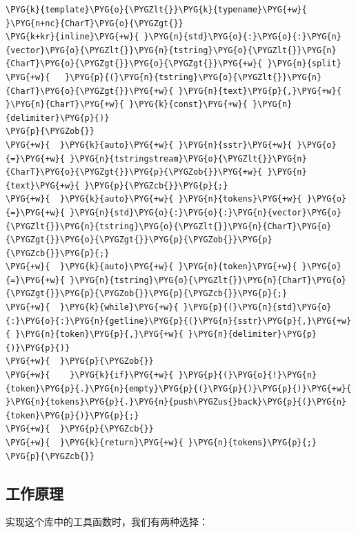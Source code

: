 \begin{codeblockbg}
\begin{Verbatim}[commandchars=\\\{\},breaklines=true,breakanywhere=true,fontsize=\codefont,xleftmargin=17bp]
\PYG{k}{template}\PYG{o}{\PYGZlt{}}\PYG{k}{typename}\PYG{+w}{ }\PYG{n+nc}{CharT}\PYG{o}{\PYGZgt{}}
\PYG{k+kr}{inline}\PYG{+w}{ }\PYG{n}{std}\PYG{o}{:}\PYG{o}{:}\PYG{n}{vector}\PYG{o}{\PYGZlt{}}\PYG{n}{tstring}\PYG{o}{\PYGZlt{}}\PYG{n}{CharT}\PYG{o}{\PYGZgt{}}\PYG{o}{\PYGZgt{}}\PYG{+w}{ }\PYG{n}{split}
\PYG{+w}{   }\PYG{p}{(}\PYG{n}{tstring}\PYG{o}{\PYGZlt{}}\PYG{n}{CharT}\PYG{o}{\PYGZgt{}}\PYG{+w}{ }\PYG{n}{text}\PYG{p}{,}\PYG{+w}{ }\PYG{n}{CharT}\PYG{+w}{ }\PYG{k}{const}\PYG{+w}{ }\PYG{n}{delimiter}\PYG{p}{)}
\PYG{p}{\PYGZob{}}
\PYG{+w}{  }\PYG{k}{auto}\PYG{+w}{ }\PYG{n}{sstr}\PYG{+w}{ }\PYG{o}{=}\PYG{+w}{ }\PYG{n}{tstringstream}\PYG{o}{\PYGZlt{}}\PYG{n}{CharT}\PYG{o}{\PYGZgt{}}\PYG{p}{\PYGZob{}}\PYG{+w}{ }\PYG{n}{text}\PYG{+w}{ }\PYG{p}{\PYGZcb{}}\PYG{p}{;}
\PYG{+w}{  }\PYG{k}{auto}\PYG{+w}{ }\PYG{n}{tokens}\PYG{+w}{ }\PYG{o}{=}\PYG{+w}{ }\PYG{n}{std}\PYG{o}{:}\PYG{o}{:}\PYG{n}{vector}\PYG{o}{\PYGZlt{}}\PYG{n}{tstring}\PYG{o}{\PYGZlt{}}\PYG{n}{CharT}\PYG{o}{\PYGZgt{}}\PYG{o}{\PYGZgt{}}\PYG{p}{\PYGZob{}}\PYG{p}{\PYGZcb{}}\PYG{p}{;}
\PYG{+w}{  }\PYG{k}{auto}\PYG{+w}{ }\PYG{n}{token}\PYG{+w}{ }\PYG{o}{=}\PYG{+w}{ }\PYG{n}{tstring}\PYG{o}{\PYGZlt{}}\PYG{n}{CharT}\PYG{o}{\PYGZgt{}}\PYG{p}{\PYGZob{}}\PYG{p}{\PYGZcb{}}\PYG{p}{;}
\PYG{+w}{  }\PYG{k}{while}\PYG{+w}{ }\PYG{p}{(}\PYG{n}{std}\PYG{o}{:}\PYG{o}{:}\PYG{n}{getline}\PYG{p}{(}\PYG{n}{sstr}\PYG{p}{,}\PYG{+w}{ }\PYG{n}{token}\PYG{p}{,}\PYG{+w}{ }\PYG{n}{delimiter}\PYG{p}{)}\PYG{p}{)}
\PYG{+w}{  }\PYG{p}{\PYGZob{}}
\PYG{+w}{    }\PYG{k}{if}\PYG{+w}{ }\PYG{p}{(}\PYG{o}{!}\PYG{n}{token}\PYG{p}{.}\PYG{n}{empty}\PYG{p}{(}\PYG{p}{)}\PYG{p}{)}\PYG{+w}{ }\PYG{n}{tokens}\PYG{p}{.}\PYG{n}{push\PYGZus{}back}\PYG{p}{(}\PYG{n}{token}\PYG{p}{)}\PYG{p}{;}
\PYG{+w}{  }\PYG{p}{\PYGZcb{}}
\PYG{+w}{  }\PYG{k}{return}\PYG{+w}{ }\PYG{n}{tokens}\PYG{p}{;}
\PYG{p}{\PYGZcb{}}
\end{Verbatim}
\end{codeblockbg}



\subsection{工作原理}



实现这个库中的工具函数时，我们有两种选择：


